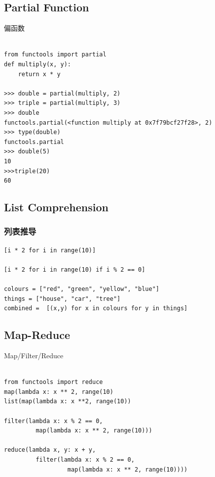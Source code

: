 \documentclass{beamer}
\begin{document}
\subsection{Partial Function}
\label{sub:Partial Function}
\begin{frame}[t,fragile]{偏函数}

\begin{verbatim}

from functools import partial
def multiply(x, y):
    return x * y

>>> double = partial(multiply, 2)
>>> triple = partial(multiply, 3)
>>> double
functools.partial(<function multiply at 0x7f79bcf27f28>, 2)
>>> type(double)
functools.partial
>>> double(5)
10
>>>triple(20)
60

\end{verbatim}
    
\end{frame}

\subsection{List Comprehension} %
\label{sub:List Comprehension}

\begin{frame}[t,fragile]
  \frametitle{列表推导}
	\begin{verbatim}
[i * 2 for i in range(10)]

[i * 2 for i in range(10) if i % 2 == 0]

colours = ["red", "green", "yellow", "blue"]
things = ["house", "car", "tree"]
combined =  [(x,y) for x in colours for y in things]
\end{verbatim}
	
\end{frame}
\subsection{Map-Reduce} %
\label{sub:Map-Reduce}

\begin{frame}[t,fragile]{Map/Filter/Reduce}
\begin{verbatim}

from functools import reduce
map(lambda x: x ** 2, range(10)
list(map(lambda x: x **2, range(10))

filter(lambda x: x % 2 == 0, 
         map(lambda x: x ** 2, range(10)))

reduce(lambda x, y: x + y,
         filter(lambda x: x % 2 == 0, 
                  map(lambda x: x ** 2, range(10))))
         
\end{verbatim}

	
\end{frame}
\end{document}
